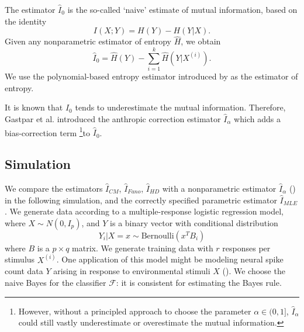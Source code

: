 The estimator $\hat{I}_0$ is the so-called `naive' estimate of mutual information, based on the identity
\[
I(X;Y) = H(Y) - H(Y|X).
\]
Given any nonparametric estimator of entropy $\hat{H}$, we obtain
\[
\hat{I}_0 = \hat{H}(Y) - \sum_{i=1}^k \hat{H}(Y|X^{(i)}).
\]
We use the polynomial-based entropy estimator introduced by
\cite{jiao2015minimax} as the estimator of entropy.  

It is known that $\hat{I}_0$ tends to underestimate the mutual
information.  Therefore, Gastpar et al. introduced the anthropic
correction estimator $\hat{I}_\alpha$ which adds a bias-correction
term \footnote{However, without a principled approach to choose the
  parameter $\alpha \in (0,1]$, $\hat{I}_\alpha$ could still vastly
underestimate or overestimate the mutual information.}to $\hat{I}_0$.

\subsection{Simulation}

We compare the estimators $\hat{I}_{CM}$, $\hat{I}_{Fano}$,
$\hat{I}_{HD}$ with a nonparametric estimator $\hat{I}_\alpha$
(\cite{Gastpar2009}) in the following simulation, and the correctly
specified parametric estimator $\hat{I}_{MLE}$.  We generate data
according to a multiple-response logistic regression model, where $ X
\sim N(0, I_p) $, and $Y$ is a binary vector with conditional
distribution
\[
Y_i|X = x \sim \text{Bernoulli}(x^T B_i)
\]
where $B$ is a $p \times q$ matrix.  We generate training data with
$r$ responses per stimulus $X^{(i)}$.  One application of this model
might be modeling neural spike count data $Y$ arising in response to
environmental stimuli $X$ (\cite{banerjee2012parametric}).  We choose
the naive Bayes for the classifier $\mathcal{F}$: it is consistent for
estimating the Bayes rule.

